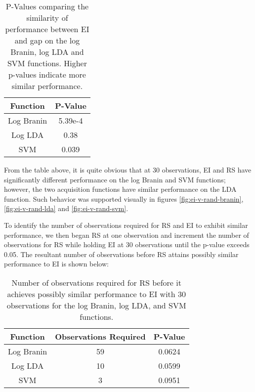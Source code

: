 \documentclass[11pt]{article}
\numberwithin{equation}{section}
\begin{document}
\begin{table}[H]
  \centering
  \begin{tabular}{| c | c |}
    \hline
    Function & P-Value  \\
    \hline
    Log Branin   & 5.39e-4 \\
    \hline
    Log LDA      & 0.38  \\
    \hline
    SVM      & 0.039   \\
    \hline
  \end{tabular}
  \caption{P-Values comparing the similarity of performance between EI and gap on the log Branin, log LDA and SVM functions. Higher p-values indicate more similar performance.}
  \label{tab:ei-rs-pvals}
\end{table}

From the table above, it is quite obvious that at 30 observations, EI and RS have significantly different performance on the log Branin and SVM functions; however, the two acquisition functions have similar performance on the LDA function. Such behavior was supported visually in figures \ref{fig:ei-v-rand-branin}, \ref{fig:ei-v-rand-lda} and \ref{fig:ei-v-rand-svm}.

To identify the number of observations required for RS and EI to exhibit similar performance, we then began RS at one observation and increment the number of observations for RS while holding EI at 30 observations until the p-value exceeds 0.05. The resultant number of observations before RS attains possibly similar performance to EI is shown below:

\begin{table}[H]
  \centering
  \begin{tabular}{| c | c | c |}
    \hline
    Function & Observations Required & P-Value \\
    \hline
    Log Branin & 59 & 0.0624 \\
    \hline
    Log LDA & 10 & 0.0599 \\
    \hline
    SVM & 3 & 0.0951 \\
    \hline
  \end{tabular}
  \caption{Number of observations required for RS before it achieves possibly similar performance to EI with 30 observations for the log Branin, log LDA, and SVM functions.}
  \label{tab:ei-rs-pvals-to-equivalence}
\end{table}
\end{document}
